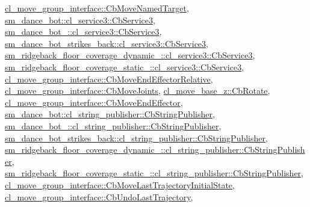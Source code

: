 \hyperlink{classcl__move__group__interface_1_1CbMoveNamedTarget_ab212edda280e896977d7ac567e4c1b29}{cl\+\_\+move\+\_\+group\+\_\+interface\+::\+Cb\+Move\+Named\+Target}, \hyperlink{classsm__dance__bot_1_1cl__service3_1_1CbService3_ae9e3796b507ad96cc0890fec0f64a4b7}{sm\+\_\+dance\+\_\+bot\+::cl\+\_\+service3\+::\+Cb\+Service3}, \hyperlink{classsm__dance__bot__2_1_1cl__service3_1_1CbService3_a179e43cc240f53f9c49c67094e41d75f}{sm\+\_\+dance\+\_\+bot\+\_\+::cl\+\_\+service3\+::\+Cb\+Service3}, \hyperlink{classsm__dance__bot__strikes__back_1_1cl__service3_1_1CbService3_a09a2fda38973e1e3915b63a47ca67ed1}{sm\+\_\+dance\+\_\+bot\+\_\+strikes\+\_\+back\+::cl\+\_\+service3\+::\+Cb\+Service3}, \hyperlink{classsm__ridgeback__floor__coverage__dynamic__1_1_1cl__service3_1_1CbService3_a2bea1cd5cff40e33307b0858ea9baf0b}{sm\+\_\+ridgeback\+\_\+floor\+\_\+coverage\+\_\+dynamic\+\_\+::cl\+\_\+service3\+::\+Cb\+Service3}, \hyperlink{classsm__ridgeback__floor__coverage__static__1_1_1cl__service3_1_1CbService3_a0eda2e4af98ebc090234b7f7eacced89}{sm\+\_\+ridgeback\+\_\+floor\+\_\+coverage\+\_\+static\+\_\+::cl\+\_\+service3\+::\+Cb\+Service3}, \hyperlink{classcl__move__group__interface_1_1CbMoveEndEffectorRelative_a805a9d0f85ecdb1f503c1d6349ed9036}{cl\+\_\+move\+\_\+group\+\_\+interface\+::\+Cb\+Move\+End\+Effector\+Relative}, \hyperlink{classcl__move__group__interface_1_1CbMoveJoints_a23e4181af695aed9fa6bb4ae3f17fd76}{cl\+\_\+move\+\_\+group\+\_\+interface\+::\+Cb\+Move\+Joints}, \hyperlink{classcl__move__base__z_1_1CbRotate_a316ee51ecfd3f10fd1edae0d7d3b26c0}{cl\+\_\+move\+\_\+base\+\_\+z\+::\+Cb\+Rotate}, \hyperlink{classcl__move__group__interface_1_1CbMoveEndEffector_a7e7c22ac6c5725bc95e9852c3f6d939d}{cl\+\_\+move\+\_\+group\+\_\+interface\+::\+Cb\+Move\+End\+Effector}, \hyperlink{classsm__dance__bot_1_1cl__string__publisher_1_1CbStringPublisher_a7aa533578e820ee90d92d15b85d42e9b}{sm\+\_\+dance\+\_\+bot\+::cl\+\_\+string\+\_\+publisher\+::\+Cb\+String\+Publisher}, \hyperlink{classsm__dance__bot__2_1_1cl__string__publisher_1_1CbStringPublisher_abc3c362ea55110f8d340e5cb4d901892}{sm\+\_\+dance\+\_\+bot\+\_\+::cl\+\_\+string\+\_\+publisher\+::\+Cb\+String\+Publisher}, \hyperlink{classsm__dance__bot__strikes__back_1_1cl__string__publisher_1_1CbStringPublisher_a2c3963143fe180a5e5f939362857d2e0}{sm\+\_\+dance\+\_\+bot\+\_\+strikes\+\_\+back\+::cl\+\_\+string\+\_\+publisher\+::\+Cb\+String\+Publisher}, \hyperlink{classsm__ridgeback__floor__coverage__dynamic__1_1_1cl__string__publisher_1_1CbStringPublisher_a50bac09cd616c4ba6be03fadf77612cf}{sm\+\_\+ridgeback\+\_\+floor\+\_\+coverage\+\_\+dynamic\+\_\+::cl\+\_\+string\+\_\+publisher\+::\+Cb\+String\+Publisher}, \hyperlink{classsm__ridgeback__floor__coverage__static__1_1_1cl__string__publisher_1_1CbStringPublisher_a35027bdfa78cbe6becf627f3af3fa91b}{sm\+\_\+ridgeback\+\_\+floor\+\_\+coverage\+\_\+static\+\_\+::cl\+\_\+string\+\_\+publisher\+::\+Cb\+String\+Publisher}, \hyperlink{classcl__move__group__interface_1_1CbMoveLastTrajectoryInitialState_ad51f4883ea1f7442875cda06c3d474c3}{cl\+\_\+move\+\_\+group\+\_\+interface\+::\+Cb\+Move\+Last\+Trajectory\+Initial\+State}, \hyperlink{classcl__move__group__interface_1_1CbUndoLastTrajectory_a3c55fa93ff65d8eccb8cc14a420cb7b2}{cl\+\_\+move\+\_\+group\+\_\+interface\+::\+Cb\+Undo\+Last\+Trajectory}, 